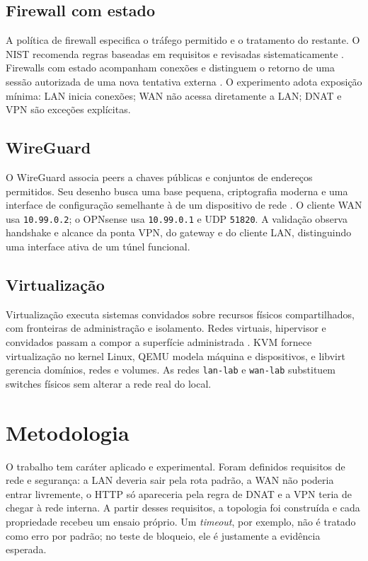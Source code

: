 \documentclass[12pt,a4paper]{article}
\newcommand{\ip}[1]{\texttt{#1}}
\begin{document}
\subsection{Firewall com estado}
A política de firewall especifica o tráfego permitido e o tratamento do restante.
O NIST recomenda regras baseadas em requisitos e revisadas sistematicamente
\citep{nist80041}. Firewalls com estado acompanham conexões e distinguem o
retorno de uma sessão autorizada de uma nova tentativa externa
\citep{cheswick2003}. O experimento adota exposição mínima: LAN inicia conexões;
WAN não acessa diretamente a LAN; DNAT e VPN são exceções explícitas.

\subsection{WireGuard}
O WireGuard associa peers a chaves públicas e conjuntos de endereços permitidos.
Seu desenho busca uma base pequena, criptografia moderna e uma interface de
configuração semelhante à de um dispositivo de rede \citep{donenfeld2017}. O
cliente WAN usa \ip{10.99.0.2}; o OPNsense usa \ip{10.99.0.1} e UDP
\ip{51820}. A validação observa handshake e alcance da ponta VPN, do gateway e
do cliente LAN, distinguindo uma interface ativa de um túnel funcional.

\subsection{Virtualização}
Virtualização executa sistemas convidados sobre recursos físicos compartilhados,
com fronteiras de administração e isolamento. Redes virtuais, hipervisor e
convidados passam a compor a superfície administrada \citep{nist800125}. KVM
fornece virtualização no kernel Linux, QEMU modela máquina e dispositivos, e
libvirt gerencia domínios, redes e volumes. As redes \texttt{lan-lab} e
\texttt{wan-lab} substituem switches físicos sem alterar a rede real do local.

\section{Metodologia}
O trabalho tem caráter aplicado e experimental. Foram definidos requisitos de
rede e segurança: a LAN deveria sair pela rota padrão, a WAN não poderia entrar
livremente, o HTTP só apareceria pela regra de DNAT e a VPN teria de chegar à
rede interna. A partir desses requisitos, a topologia foi construída e cada
propriedade recebeu um ensaio próprio. Um \textit{timeout}, por exemplo, não é
tratado como erro por padrão; no teste de bloqueio, ele é justamente a evidência
esperada.
\end{document}
